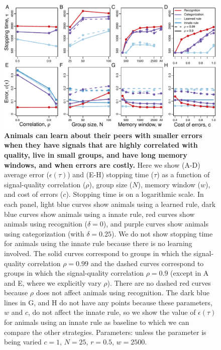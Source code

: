 \begin{figure}
\includegraphics[width=6.85in]{figures/parameters_exploration.pdf}
\caption{\sffamily\small\textbf{Animals can learn about their peers with smaller errors when they have signals that are highly correlated with quality, live in small groups, and have long memory windows, and when errors are costly.} Here we show (A-D) average error ($\epsilon(\tau)$) and (E-H) stopping time ($\tau$) as a function of signal-quality correlation ($\rho$), group size ($N$), memory window ($w$), and cost of errors ($c$). Stopping time is on a logarithmic scale. In each panel, light blue curves show animals using a learned rule, dark blue curves show animals using a innate rule, red curves show animals using recognition ($\delta=0$), and purple curves show animals using categorization (with $\delta=0.25$). We do not show stopping time for animals using the innate rule because there is no learning involved.  The solid curves correspond to groups in which the signal-quality correlation $\rho=0.99$ and the dashed curves correspond to groups in which the signal-quality correlation $\rho=0.9$ (except in A and E, where we explicitly vary $\rho$). There are no dashed red curves because $\rho$ does not affect animals using recognition. The dark blue lines in G, and H do not have any points because these parameters, $w$ and $c$, do not affect the innate rule, so we show the value of $\epsilon(\tau)$ for animals using an innate rule as baseline to which we can compare the other strategies. Parameters: unless the parameter is being varied $c=1$, $N=25$, $r=0.5$, $w=2500$.}
\label{parameters}
\end{figure}


